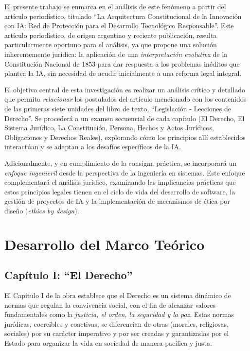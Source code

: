 \documentclass[10pt, a4paper]{article}
\begin{document}
El presente trabajo se enmarca en el análisis de este fenómeno a partir del artículo periodístico, titulado \enquote{La Arquitectura Constitucional de la Innovación con IA: Red de Protección para el Desarrollo Tecnológico Responsable}. Este artículo periodístico, de origen argentino y reciente publicación, resulta particularmente oportuno para el análisis, ya que propone una solución inherentemente jurídica: la aplicación de una \emph{interpretación evolutiva} de la Constitución Nacional de 1853 para dar respuesta a los problemas inéditos que plantea la IA, sin necesidad de acudir inicialmente a una reforma legal integral.

El objetivo central de esta investigación es realizar un análisis crítico y detallado que permita \emph{relacionar} los postulados del artículo mencionado con los contenidos de las primeras siete unidades del libro de texto, \enquote{Legislación - Lecciones de Derecho}. Se procederá a un examen secuencial de cada capítulo (El Derecho, El Sistema Jurídico, La Constitución, Persona, Hechos y Actos Jurídicos, Obligaciones y Derechos Reales), explorando cómo los principios allí establecidos interactúan y se adaptan a los desafíos específicos de la IA.

Adicionalmente, y en cumplimiento de la consigna práctica, se incorporará un \emph{enfoque ingenieril} desde la perspectiva de la ingeniería en sistemas. Este enfoque complementará el análisis jurídico, examinando las implicancias prácticas que estos principios legales tienen en el ciclo de vida del desarrollo de software, la gestión de proyectos de IA y la implementación de mecanismos de ética por diseño (\emph{ethics by design}).

\section{Desarrollo del Marco Teórico}
\label{sec:desarrollo}

\subsection{Capítulo I: ``El Derecho''}
\label{subsec:derecho}

El Capítulo I de la obra \textcite{libro_legislacion} establece que el Derecho es un sistema dinámico de normas que regulan la convivencia social, con el fin de alcanzar valores fundamentales como la \emph{justicia, el orden, la seguridad y la paz}. Estas normas jurídicas, coercibles y coactivas, se diferencian de otras (morales, religiosas, sociales) por su carácter imperativo y por ser creadas y garantizadas por el Estado para organizar la vida en sociedad de manera pacífica y justa.
\end{document}
